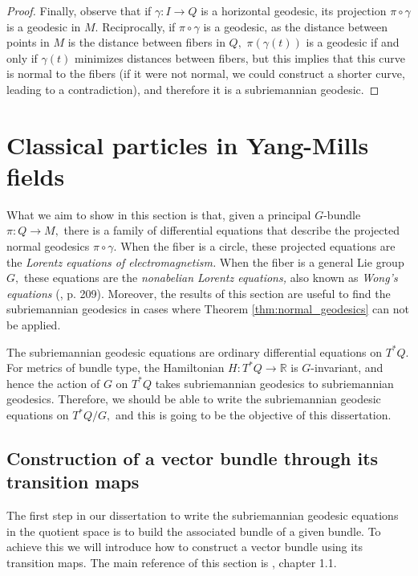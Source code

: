 \documentclass[12pt, letterpaper, reqno]{amsart}
\theoremstyle{definition}
\theoremstyle{plain}
\theoremstyle{remark}
\begin{document}
\begin{proof}
	Finally, observe that if $ \gamma: I \rightarrow Q $ is a horizontal geodesic, its projection $ \pi\circ\gamma $ is a geodesic in $ M. $ Reciprocally, if $ \pi\circ\gamma $ is a geodesic, as the distance between points in $ M $ is the distance between fibers in $ Q, $ $ \pi(\gamma(t) ) $ is a geodesic if and only if $\gamma(t)$ minimizes distances between fibers, but this implies that this curve is normal to the fibers (if it were not normal, we could construct a shorter curve, leading to a contradiction), and therefore it is a subriemannian geodesic.  
\end{proof}

\section{Classical particles in Yang-Mills fields}%
\label{sec:classical_particles_in_yang_mills_fields}


What we aim to show in this section is that, given a principal $ G $-bundle $ \pi:Q \rightarrow M, $ there is a family of differential equations that describe the projected normal geodesics $ \pi\circ\gamma. $ When the fiber is a circle, these projected equations are the \textit{Lorentz equations of electromagnetism.} When the fiber is a general Lie group $ G, $ these equations are the \textit{nonabelian Lorentz equations,} also known as \textit{Wong's equations} (\cite{montgomery2002tour}, p. 209). Moreover, the results of this section are useful to find the subriemannian geodesics in cases where Theorem \ref{thm:normal_geodesics} can not be applied.

The subriemannian geodesic equations are ordinary differential equations on $ T^*Q. $ For metrics of bundle type, the Hamiltonian $ H: T^*Q \rightarrow  \mathbb{R} $ is $ G $-invariant, and hence the action of $ G $ on $ T^*Q $ takes subriemannian geodesics to subriemannian geodesics. Therefore, we should be able to write the subriemannian geodesic equations on $ T^*Q/G, $ and this is going to be the objective of this dissertation.

\subsection{Construction of a vector bundle through its transition maps}%
\label{sub:construction_of_a_vector_bundle_through_its_transition_maps}
The first step in our dissertation to write the subriemannian geodesic equations in the quotient space is to build the associated bundle of a given bundle. To achieve this we will introduce how to construct a vector bundle using its transition maps. The main reference of this section is \cite{luke2013vector}, chapter 1.1. 
\end{document}
